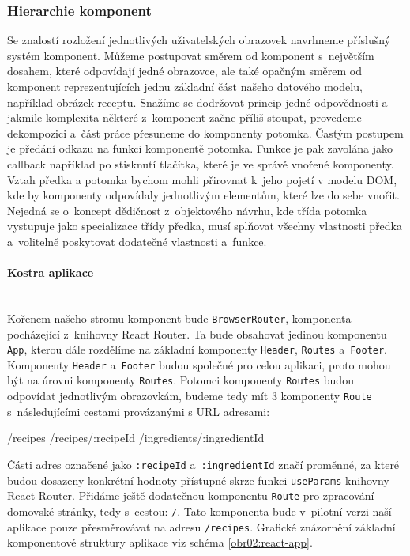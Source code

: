\subsubsection{Hierarchie komponent}

Se znalostí rozložení jednotlivých uživatelských obrazovek navrhneme příslušný systém komponent. Můžeme postupovat směrem od komponent s~největším dosahem, které odpovídají jedné obrazovce, ale také opačným směrem od komponent reprezentujících jednu základní část našeho datového modelu, například obrázek receptu. Snažíme se dodržovat princip jedné odpovědnosti a jakmile komplexita některé z~komponent začne příliš stoupat, provedeme dekompozici a~část práce přesuneme do komponenty potomka. Častým postupem je předání odkazu na funkci komponentě potomka. Funkce je pak zavolána jako callback například po stisknutí tlačítka, které je ve správě vnořené komponenty. Vztah předka a potomka bychom mohli přirovnat k~jeho pojetí v modelu DOM, kde by komponenty odpovídaly jednotlivým elementům, které lze do sebe vnořit. Nejedná se o~koncept dědičnost z~objektového návrhu, kde třída potomka vystupuje jako specializace třídy předka, musí splňovat všechny vlastnosti předka a~volitelně poskytovat dodatečné vlastnosti a~funkce.

\paragraph{Kostra aplikace}\mbox{}\\

Kořenem našeho stromu komponent bude \texttt{BrowserRouter}, komponenta pocházející z~knihovny React Router. Ta bude obsahovat jedinou komponentu \texttt{App}, kterou dále rozdělíme na základní komponenty \texttt{Header}, \texttt{Routes} a~\texttt{Footer}. Komponenty \texttt{Header} a~\texttt{Footer} budou společné pro celou aplikaci, proto mohou být na úrovni komponenty \texttt{Routes}. Potomci komponenty \texttt{Routes} budou odpovídat jednotlivým obrazovkám, budeme tedy mít $3$ komponenty \texttt{Route} s~následujícími cestami provázanými s URL adresami:

\begin{code}
/recipes
/recipes/:recipeId
/ingredients/:ingredientId
\end{code}

Části adres označené jako \texttt{:recipeId} a~\texttt{:ingredientId} značí proměnné, za které budou dosazeny konkrétní hodnoty přístupné skrze funkci \texttt{useParams} kni\-hovny React Router. Přidáme ještě dodatečnou komponentu \texttt{Route} pro zpracování domovské stránky, tedy s~cestou: \texttt{/}. Tato komponenta bude v~pilotní verzi naší aplikace pouze přesměrovávat na adresu \texttt{/recipes}. Grafické znázornění základní komponentové struktury aplikace viz schéma \ref{obr02:react-app}.

